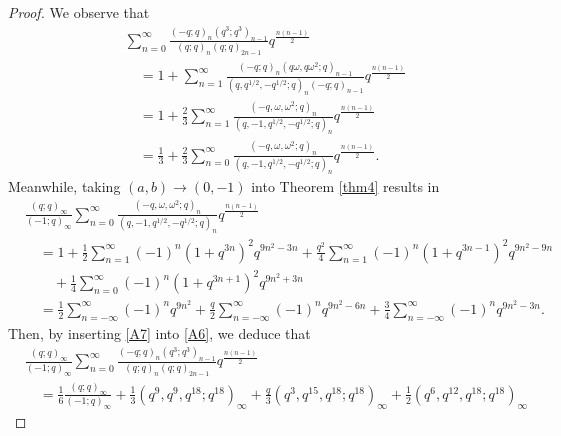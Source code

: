 \documentclass[reqno,12pt]{amsart}
\theoremstyle{remark}
\numberwithin{equation}{section}
\begin{document}
\begin{proof}
We observe that
\begin{align}
&\sum_{n=0}^{\infty}\frac{\left(-q;q\right)_n\left(q^3;q^3\right)_{n-1}
}
{\left(q;q\right)_{n}\left(q;q\right)_{2n-1}}q^{\frac{n(n-1)}{2}}\nonumber\\
&\quad=1+\sum_{n=1}^{\infty}\frac{\left(-q;q\right)_n
\left(q\omega,q\omega^2;q\right)_{n-1}}
{\left(q,q^{1/2},-q^{1/2};q\right)_n\left(-q;q\right)_{n-1}}
q^{\frac{n\left(n-1\right)}{2}}\nonumber\\
&\quad=1+\frac{2}{3}\sum_{n=1}^{\infty}\frac{\left(-q,\omega,\omega^2;q\right)_{n}}
{\left(q,-1,q^{1/2},-q^{1/2};q\right)_n}
q^{\frac{n\left(n-1\right)}{2}}\nonumber\\
&\quad=\frac{1}{3}+\frac{2}{3}\sum_{n=0}^{\infty}\frac{\left(-q,\omega,\omega^2;q\right)_{n}}
{\left(q,-1,q^{1/2},-q^{1/2};q\right)_n}
q^{\frac{n\left(n-1\right)}{2}}.\label{A6}
\end{align}
Meanwhile, taking $\left(a,b\right)\to\left(0,-1\right)$ into Theorem \ref{thm4} results in
\begin{align}
&\frac{\left(q;q\right)_{\infty}}{\left(-1;q\right)_{\infty}}
\sum_{n=0}^{\infty}\frac{\left(-q,\omega,\omega^2;q\right)_n}
{\left(q,-1,q^{1/2},-q^{1/2};q\right)_n}q^{\frac{n\left(n-1\right)}{2}}\nonumber\\
&\quad=1+\frac{1}{2}\sum_{n=1}^{\infty}\left(-1\right)^n\left(1+q^{3n}\right)^2
q^{9n^2-3n}
+\frac{q^2}{4}\sum_{n=1}^{\infty}\left(-1\right)^n\left(1+q^{3n-1}\right)^2
q^{9n^2-9n}\nonumber\\
&\qquad+\frac{1}{4}\sum_{n=0}^{\infty}\left(-1\right)^n\left(1+q^{3n+1}\right)^2
q^{9n^2+3n}\nonumber\\
&\quad=\frac{1}{2}\sum_{n=-\infty}^{\infty}\left(-1\right)^nq^{9n^2}
+\frac{q}{2}\sum_{n=-\infty}^{\infty}\left(-1\right)^nq^{9n^2-6n}
+\frac{3}{4}\sum_{n=-\infty}^{\infty}\left(-1\right)^nq^{9n^2-3n}.\label{A7}
\end{align}
Then, by inserting \eqref{A7} into \eqref{A6}, we deduce that
\begin{align}
&\frac{\left(q;q\right)_{\infty}}{\left(-1;q\right)_{\infty}}
\sum_{n=0}^{\infty}\frac{\left(-q;q\right)_n\left(q^3;q^3\right)_{n-1}
}
{\left(q;q\right)_{n}\left(q;q\right)_{2n-1}}q^{\frac{n(n-1)}{2}}\nonumber\\
&\quad=\frac{1}{6}\frac{\left(q;q\right)_{\infty}}{\left(-1;q\right)_{\infty}}
+\frac{1}{3}\left(q^9,q^9,q^{18};q^{18}\right)_{\infty}
+\frac{q}{3}\left(q^3,q^{15},q^{18};q^{18}\right)_{\infty}
+\frac{1}{2}\left(q^6,q^{12},q^{18};q^{18}\right)_{\infty}

\end{align}
\end{proof}
\end{document}
